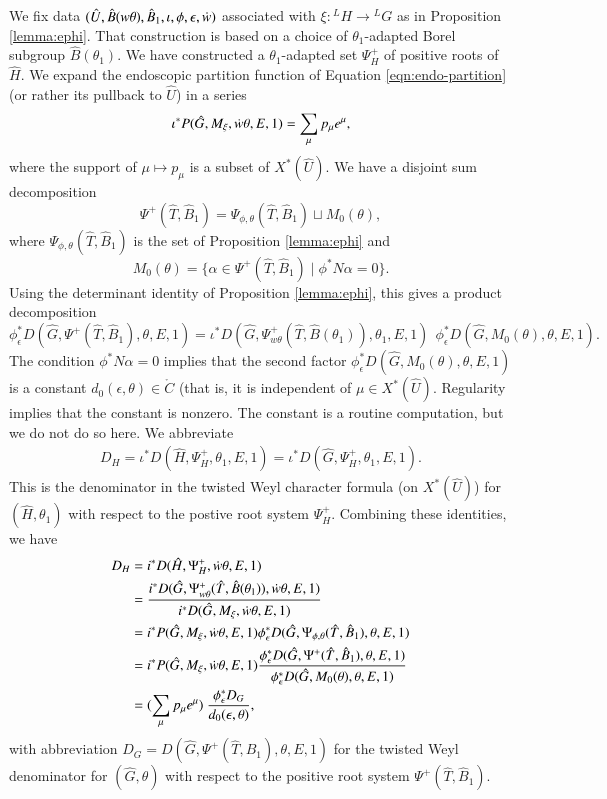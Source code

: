 We fix data $(\hat U,\hat B(w\theta),\hat B_1,\iota,\phi,\epsilon,\dot w)$ associated with
$\xi:{}^LH\to{}^LG$ as in Proposition \ref{lemma:ephi}.  That
construction is based on a choice of $\theta_1$-adapted Borel subgroup
$\hat B(\theta_1)$.  We have constructed a $\theta_1$-adapted set
$\Psi^+_H$ of positive roots of $\hat H$.  We expand the endoscopic
partition function of Equation \ref{eqn:endo-partition} (or rather its
pullback to $\hat U$) in a series
\begin{equation}
\iota^* P(\hat G,M_\xi,\dot w\theta,E,1) = \sum_{\mu} p_\mu e^\mu,
\end{equation}
where the support of $\mu\mapsto p_\mu$ is a subset of $X^*(\hat U)$.  We have a
disjoint sum decomposition 
\[
\Psi^+(\hat T,\hat B_1) = \Psi_{\phi,\theta}(\hat T,\hat B_1)\sqcup M_0(\theta),
\]
where $\Psi_{\phi,\theta}(\hat T,\hat B_1)$ is the set of Proposition \ref{lemma:ephi} and
\[
M_0(\theta) = \{\alpha\in \Psi^+(\hat T,\hat B_1)\mid \phi^* N\alpha=0\}.
\]
Using the determinant identity of 
Proposition \ref{lemma:ephi}, this gives a product decomposition
\begin{equation}
\phi^*_\epsilon D(\hat G,\Psi^+(\hat T,\hat B_1),\theta,E,1) = 
\iota^* D(\hat G,\Psi_{w\theta}^+(\hat T,\hat B(\theta_1)),\theta_1,E,1) \ \ 
\phi^*_\epsilon D(\hat G,M_0(\theta),\theta,E,1).
\end{equation}
The condition $\phi^* N\alpha=0$ implies that 
the second factor $\phi^*_\epsilon D(\hat G,M_0(\theta),\theta,E,1)$
is a constant $d_0(\epsilon,\theta)\in\ring{C}$ (that is, it is
independent of $\mu\in X^*(\hat U)$.  Regularity implies that 
the constant is nonzero.  The constant is  a routine computation, but we  do not do so here.
We abbreviate
\begin{align*}
D_H = \iota^* D(\hat H,\Psi^+_H,\theta_1,E,1) = \iota^* D(\hat G,\Psi^+_H,\theta_1,E,1).
\end{align*}
This is the denominator in the twisted Weyl character formula (on
$X^*(\hat U)$) for $(\hat H,\theta_1)$
with respect to the postive root system $\Psi^+_H$.
Combining these identities, we have
\begin{align}\label{eqn:DHDG}
\begin{split}
D_H &= i^* D(\hat H,\Psi^+_H,\dot w\theta,E,1)\\
&=\frac{i^*D(\hat G,\Psi_{w\theta}^+(\hat T,\hat B(\theta_1)),\dot w\theta,E,1)}
{i^*D(\hat G,M_\xi,\dot w\theta,E,1)}\\
&=
{i^*P(\hat G,M_\xi,\dot w\theta,E,1)}
\phi^*_\epsilon D(\hat G,\Psi_{\phi,\theta}(\hat T,\hat B_1),\theta,E,1)\\
&=
{i^*P(\hat G,M_\xi,\dot w\theta,E,1)}
\frac{\phi^*_\epsilon D(\hat G,\Psi^+(\hat T,\hat B_1),\theta,E,1)}
{\phi^*_\epsilon D(\hat G,M_0(\theta),\theta,E,1)}\\
&=
(\sum_{\mu} p_\mu e^\mu) 
\ \frac{\phi^*_\epsilon D_G}{
d_0(\epsilon,\theta)},
\end{split}
\end{align}
with abbreviation $D_G= D(\hat G,\Psi^+(\hat T,\hat B_1),\theta,E,1)$ for
the twisted Weyl denominator for $(\hat G,\theta)$ with respect to the positive
root system $\Psi^+(\hat T,\hat B_1)$.


